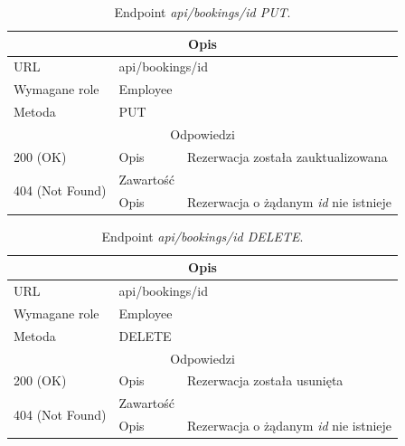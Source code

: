 \documentclass[eng,printmode,openany]{mgr}
\begin{document}
	\begin{table}[H]
		\caption{Endpoint \textit{api/bookings/id PUT}.}
		\begin{tabularx}{\textwidth}{|l|l|X|}
			\hline
			\multicolumn{3}{|c|}{Opis}
			\\ \hline
			URL                       & \multicolumn{2}{l|}{api/bookings/id}
			\\ \hline
			Wymagane role             & \multicolumn{2}{l|}{Employee}
			\\ \hline
			Metoda                    & \multicolumn{2}{l|}{PUT}
			\\ \hline
			\multicolumn{3}{|c|}{Odpowiedzi}
			\\ \hline
			200 (OK) 		                        & Opis      	& Rezerwacja została zauktualizowana
			\\ \hline
			\multirow{2}{*}{404 (Not Found)} 	    & Zawartość     & 
			\\ \cline{2-3}                          & Opis          & Rezerwacja o żądanym \textit{id} nie istnieje
			\\ \hline
		\end{tabularx}
	\end{table}
	
	\begin{table}[H]
		\caption{Endpoint \textit{api/bookings/id DELETE}.}
		\begin{tabularx}{\textwidth}{|l|l|X|}
			\hline
			\multicolumn{3}{|c|}{Opis}
			\\ \hline
			URL                       & \multicolumn{2}{l|}{api/bookings/id}
			\\ \hline
			Wymagane role             & \multicolumn{2}{l|}{Employee}
			\\ \hline
			Metoda                    & \multicolumn{2}{l|}{DELETE}
			\\ \hline
			\multicolumn{3}{|c|}{Odpowiedzi}
			\\ \hline
			200 (OK)			                & Opis         	& Rezerwacja została usunięta
			\\ \hline
			\multirow{2}{*}{404 (Not Found)} 	& Zawartość     & 
			\\ \cline{2-3}                      & Opis          & Rezerwacja o żądanym \textit{id} nie istnieje
			\\ \hline
		\end{tabularx}
	\end{table}
	
\end{document}

